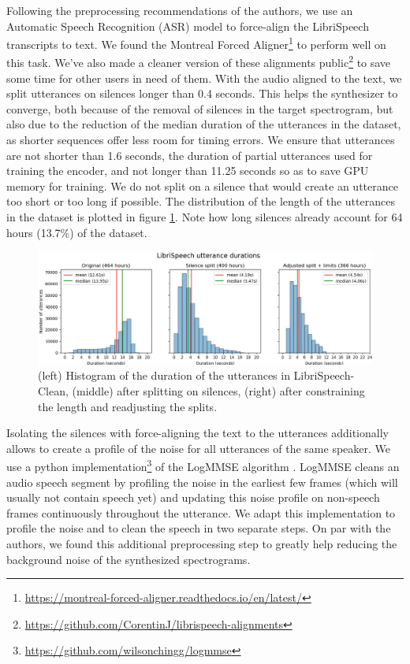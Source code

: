 \documentclass[a4paper, oneside, 12pt, english]{article}
\begin{document}
Following the preprocessing recommendations of the authors, we use an Automatic Speech Recognition (ASR) model to force-align the LibriSpeech transcripts to text. We found the Montreal Forced Aligner\footnote{\url{https://montreal-forced-aligner.readthedocs.io/en/latest/}} to perform well on this task. We've also made a cleaner version of these alignments public\footnote{\url{https://github.com/CorentinJ/librispeech-alignments}} to save some time for other users in need of them. With the audio aligned to the text, we split utterances on silences longer than 0.4 seconds. This helps the synthesizer to converge, both because of the removal of silences in the target spectrogram, but also due to the reduction of the median duration of the utterances in the dataset, as shorter sequences offer less room for timing errors. We ensure that utterances are not shorter than 1.6 seconds, the duration of partial utterances used for training the encoder, and not longer than 11.25 seconds so as to save GPU memory for training. We do not split on a silence that would create an utterance too short or too long if possible. The distribution of the length of the utterances in the dataset is plotted in figure \ref{librispeech_durations}. Note how long silences already account for 64 hours (13.7\%) of the dataset.

\begin{figure}[h]
	\centering
	\includegraphics[width=\linewidth]{images/librispeech_durations.png}
	\caption{(left) Histogram of the duration of the utterances in LibriSpeech-Clean, (middle) after splitting on silences, (right) after constraining the length and readjusting the splits.}
	\label{librispeech_durations}
\end{figure}

Isolating the silences with force-aligning the text to the utterances additionally allows to create a profile of the noise for all utterances of the same speaker. We use a python implementation\footnote{\url{https://github.com/wilsonchingg/logmmse}} of the LogMMSE algorithm \cite{LogMMSE}. LogMMSE cleans an audio speech segment by profiling the noise in the earliest few frames (which will usually not contain speech yet) and updating this noise profile on non-speech frames continuously throughout the utterance. We adapt this implementation to profile the noise and to clean the speech in two separate steps. On par with the authors, we found this additional preprocessing step to greatly help reducing the background noise of the synthesized spectrograms.
\end{document}
